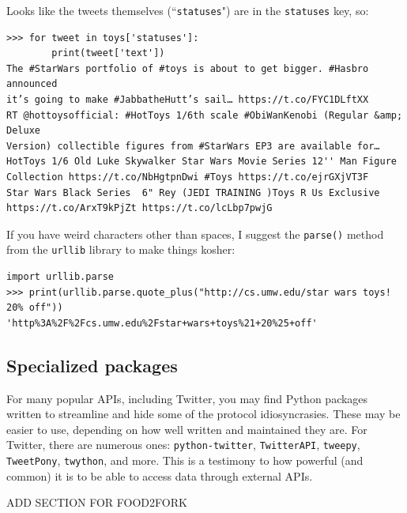 \documentclass[12pt]{article}
\begin{document}
Looks like the tweets themselves (``\texttt{statuses}") are in the
\texttt{statuses} key, so:

\small
\begin{Verbatim}[fontsize=\small,samepage=true,frame=none]
>>> for tweet in toys['statuses']:
        print(tweet['text'])
The #StarWars portfolio of #toys is about to get bigger. #Hasbro announced
it’s going to make #JabbatheHutt’s sail… https://t.co/FYC1DLftXX
RT @hottoysofficial: #HotToys 1/6th scale #ObiWanKenobi (Regular &amp; Deluxe
Version) collectible figures from #StarWars EP3 are available for…
HotToys 1/6 Old Luke Skywalker Star Wars Movie Series 12'' Man Figure
Collection https://t.co/NbHgtpnDwi #Toys https://t.co/ejrGXjVT3F
Star Wars Black Series  6" Rey (JEDI TRAINING )Toys R Us Exclusive
https://t.co/ArxT9kPjZt https://t.co/lcLbp7pwjG
\end{Verbatim}
\normalsize


If you have weird characters other than spaces, I suggest the \texttt{parse()}
method from the \texttt{urllib} library to make things kosher:

\begin{Verbatim}[fontsize=\small,samepage=true,frame=none]
import urllib.parse
>>> print(urllib.parse.quote_plus("http://cs.umw.edu/star wars toys! 20% off"))
'http%3A%2F%2Fcs.umw.edu%2Fstar+wars+toys%21+20%25+off'
\end{Verbatim}


\subsection{Specialized packages}

For many popular APIs, including Twitter, you may find Python packages written
to streamline and hide some of the protocol idiosyncrasies. These may be
easier to use, depending on how well written and maintained they are. For
Twitter, there are numerous ones: \texttt{python-twitter},
\texttt{TwitterAPI}, \texttt{tweepy}, \texttt{TweetPony}, \texttt{twython},
and more. This is a testimony to how powerful (and common) it is to be able to
access data through external APIs.

ADD SECTION FOR FOOD2FORK
\end{document}
